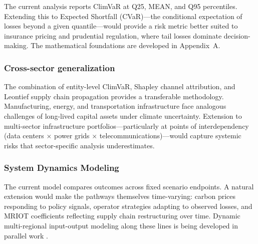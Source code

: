 \begin{twocolbody}
The current analysis reports ClimVaR at Q25, MEAN, and Q95 percentiles. Extending this to Expected Shortfall (CVaR)---the conditional expectation of losses beyond a given quantile---would provide a risk metric better suited to insurance pricing and prudential regulation, where tail losses dominate decision-making. The mathematical foundations are developed in Appendix~A.

\subsubsection*{Cross-sector generalization}

The combination of entity-level ClimVaR, Shapley channel attribution, and Leontief supply chain propagation provides a transferable methodology. Manufacturing, energy, and transportation infrastructure face analogous challenges of long-lived capital assets under climate uncertainty. Extension to multi-sector infrastructure portfolios---particularly at points of interdependency (data centers $\times$ power grids $\times$ telecommunications)---would capture systemic risks that sector-specific analysis underestimates.

\subsubsection*{System Dynamics Modeling}

The current model compares outcomes across fixed scenario endpoints. A natural extension would make the pathways themselves time-varying: carbon prices responding to policy signals, operator strategies adapting to observed losses, and MRIOT coefficients reflecting supply chain restructuring over time. Dynamic multi-regional input-output modeling along these lines is being developed in parallel work \citep{beaufils2025}.

\end{twocolbody}
